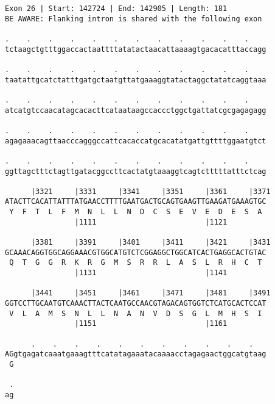 \documentclass{article}
\begin{document}
\begin{Verbatim}
Exon 26 | Start: 142724 | End: 142905 | Length: 181
BE AWARE: Flanking intron is shared with the following exon
 
.    .    .    .    .    .    .    .    .    .    .    .    
tctaagctgtttggaccactaattttatatactaacattaaaagtgacacatttaccagg
  
.    .    .    .    .    .    .    .    .    .    .    .    
taatattgcatctatttgatgctaatgttatgaaaggtatactaggctatatcaggtaaa
  
.    .    .    .    .    .    .    .    .    .    .    .    
atcatgtccaacatagcacacttcataataagccaccctggctgattatcgcgagagagg
  
.    .    .    .    .    .    .    .    .    .    .    .    
agagaaacagttaacccagggccattcacaccatgcacatatgattgttttggaatgtct
  
.    .    .    .    .    .    .    .    .    .    .    .    
ggttagctttctagttgatacggccttcactatgtaaaggtcagtctttttatttctcag
  
      |3321     |3331     |3341     |3351     |3361     |3371
ATACTTCACATTATTTATGAACCTTTTGAATGACTGCAGTGAAGTTGAAGATGAAAGTGC
 Y  F  T  L  F  M  N  L  L  N  D  C  S  E  V  E  D  E  S  A 
                |1111                         |1121         
  
      |3381     |3391     |3401     |3411     |3421     |3431
GCAAACAGGTGGCAGGAAACGTGGCATGTCTCGGAGGCTGGCATCACTGAGGCACTGTAC
 Q  T  G  G  R  K  R  G  M  S  R  R  L  A  S  L  R  H  C  T 
                |1131                         |1141         
  
      |3441     |3451     |3461     |3471     |3481     |3491
GGTCCTTGCAATGTCAAACTTACTCAATGCCAACGTAGACAGTGGTCTCATGCACTCCAT
 V  L  A  M  S  N  L  L  N  A  N  V  D  S  G  L  M  H  S  I 
                |1151                         |1161         
  
      .    .    .    .    .    .    .    .    .    .    .   
AGgtgagatcaaatgaaagtttcatatagaaatacaaaacctagagaactggcatgtaag
 G                                                          
  
 .
ag
\end{Verbatim}
\newpage
\end{document}
